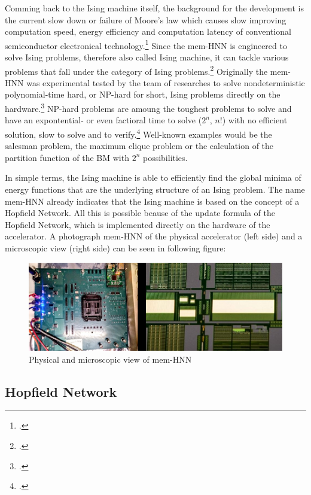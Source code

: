 Comming back to the Ising machine itself, the background for the development is the current slow down or failure of Moore's law which causes slow improving computation speed, energy efficiency and computation latency of conventional semiconductor electronical technology.\footcite[cf.][1]{caiHarnessingIntrinsicNoise2019}
Since the \ac{mem-HNN} is engineered to solve Ising problems, therefore also called Ising machine, it can tackle various problems that fall under the category of Ising problems.\footcite[cf.][363]{mohseniIsingMachinesHardware2022a}
Originally the mem-HNN was experimental tested by the team of researches to solve nondeterministic polynomial-time hard, or NP-hard for short, Ising problems directly on the hardware.\footcite[cf.][410]{caiPowerefficientCombinatorialOptimization2020}
NP-hard problems are amoung the toughest problems to solve and have an expontential- or even factioral time to solve (\( 2^{n} \), \( n{!} \)) with no efficient solution, slow to solve and to verify.\footcite[cf.][497-500]{izadkhahNPNPCompleteNPHard2022}
Well-known examples would be the salesman problem, the maximum clique problem or the calculation of the partition function of the \ac{BM} with \( 2^{n} \) possibilities.

In simple terms, the Ising machine is able to efficiently find the global minima of energy functions that are the underlying structure of an Ising problem. 
The name \ac{mem-HNN} already indicates that the Ising machine is based on the concept of a Hopfield Network.
All this is possible beause of the update formula of the Hopfield Network, which is implemented directly on the hardware of the accelerator.
A photograph \ac{mem-HNN} of the physical accelerator (left side) and a microscopic view (right side) can be seen in following figure: 
\begin{figure}[H]
    \centering
    \includegraphics[width=0.65\linewidth]{graphics/Bilder_physische_beschleuniger.jpg}
    \caption{Physical and microscopic view of \ac{mem-HNN}}
\end{figure}
\subsection{Hopfield Network}

